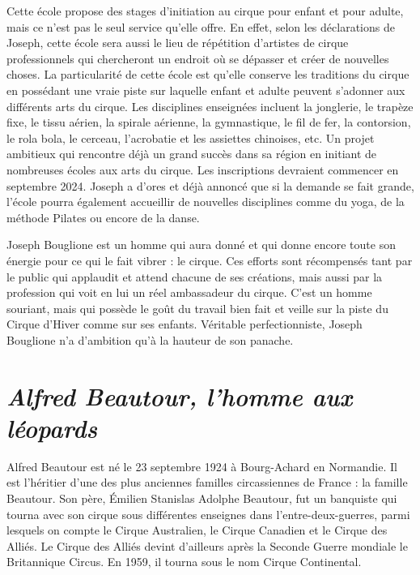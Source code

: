 Cette école propose des stages d’initiation au cirque pour enfant et pour adulte, mais ce n’est pas le seul service qu’elle offre. En effet, selon les déclarations de Joseph, cette école sera aussi le lieu de répétition d’artistes de cirque professionnels qui chercheront un endroit où se dépasser et créer de nouvelles choses. La particularité de cette école est qu’elle conserve les traditions du cirque en possédant une vraie piste sur laquelle enfant et adulte peuvent s’adonner aux différents arts du cirque. Les disciplines enseignées incluent la jonglerie, le trapèze fixe, le tissu aérien, la spirale aérienne, la gymnastique, le fil de fer, la contorsion, le rola bola, le cerceau, l’acrobatie et les assiettes chinoises, etc. Un projet ambitieux qui rencontre déjà un grand succès dans sa région en initiant de nombreuses écoles aux arts du cirque. Les inscriptions devraient commencer en septembre 2024. Joseph a d’ores et déjà annoncé que si la demande se fait grande, l’école pourra également accueillir de nouvelles disciplines comme du yoga, de la méthode Pilates ou encore de la danse.

Joseph Bouglione est un homme qui aura donné et qui donne encore toute son énergie pour ce qui le fait vibrer : le cirque. Ces efforts sont récompensés tant par le public qui applaudit et attend chacune de ses créations, mais aussi par la profession qui voit en lui un réel ambassadeur du cirque. C'est un homme souriant, mais qui possède le goût du travail bien fait et veille sur la piste du Cirque d’Hiver comme sur ses enfants. Véritable perfectionniste, Joseph Bouglione n’a d’ambition qu’à la hauteur de son panache.

\section*{\textit{Alfred Beautour, l’homme aux léopards}}
{}
\noindent
Alfred Beautour est né le 23 septembre 1924 à Bourg-Achard en Normandie. Il est l’héritier d’une des plus anciennes familles circassiennes de France : la famille Beautour. Son père, Émilien Stanislas Adolphe Beautour, fut un banquiste qui tourna avec son cirque sous différentes enseignes dans l’entre-deux-guerres, parmi lesquels on compte le Cirque Australien, le Cirque Canadien et le Cirque des Alliés. Le Cirque des Alliés devint d'ailleurs après la Seconde Guerre mondiale le Britannique Circus. En 1959, il tourna sous le nom Cirque Continental.

